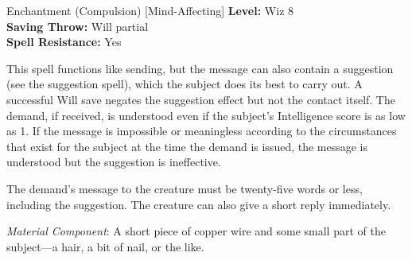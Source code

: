 {Enchantment (Compulsion) [Mind-Affecting]}
{
	\textbf{Level:}
	Wiz 8\\
	\textbf{Saving Throw:}
	Will partial\\
	\textbf{Spell Resistance:}
	Yes\\
}
{
	This spell functions like sending, but the message can also contain a suggestion (see the suggestion spell), which the subject does its best to carry out. A successful Will save negates the suggestion effect but not the contact itself. The demand, if received, is understood even if the subject's Intelligence score is as low as 1. If the message is impossible or meaningless according to the circumstances that exist for the subject at the time the demand is issued, the message is understood but the suggestion is ineffective.

	The demand's message to the creature must be twenty-five words or less, including the suggestion. The creature can also give a short reply immediately.

	\textit{Material Component}:
	A short piece of copper wire and some small part of the subject---a hair, a bit of nail, or the like.

}
